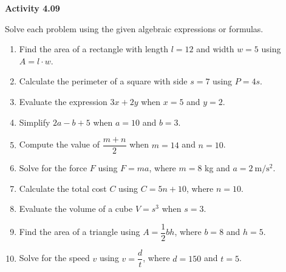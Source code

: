 \vspace{0.3ex}
\noindent\textbf{Activity 4.09}

\vspace{0.2ex}

Solve each problem using the given algebraic expressions or formulas. 

\begin{enumerate}
   \item Find the area of a rectangle with length \(l = 12\) and width \(w = 5\) using \(A = l \cdot w\).  
    \item Calculate the perimeter of a square with side \(s = 7\) using \(P = 4s\).  
    \item Evaluate the expression \(3x + 2y\) when \(x = 5\) and \(y = 2\).  
    \item Simplify \(2a - b + 5\) when \(a = 10\) and \(b = 3\).  
    \item Compute the value of \(\dfrac{m + n}{2}\) when \(m = 14\) and \(n = 10\).  
    \item Solve for the force \(F\) using \(F = ma\), where \(m = 8\) kg and \(a = 2\ \mathrm{m/s^2}\).  
    \item Calculate the total cost \(C\) using \(C = 5n + 10\), where \(n = 10\).  
    \item Evaluate the volume of a cube \(V = s^3\) when \(s = 3\).  
    \item Find the area of a triangle using \(A = \dfrac{1}{2}bh\), where \(b = 8\) and \(h = 5\).  
    \item Solve for the speed \(v\) using \(v = \dfrac{d}{t}\), where \(d = 150\) and \(t = 5\).  
\end{enumerate}
